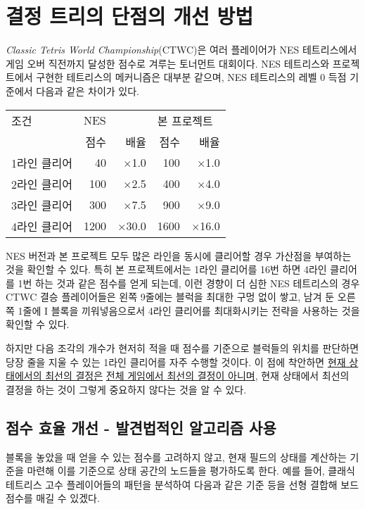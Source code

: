 \section{결정 트리의 단점의 개선 방법}
\textit{Classic Tetris World Championship}(CTWC)은 여러 플레이어가 NES 테트리스에서
게임 오버 직전까지 달성한 점수로 겨루는 토너먼트 대회이다. NES 테트리스와 프로젝트에서 구현한 테트리스의 메커니즘은 대부분 같으며, NES 테트리스의
레벨 0 득점 기준에서 다음과 같은 차이가 있다.

\begin{center}
    \begin{tabular}{l|rr|rr}
        조건 & \multicolumn{2}{l|}{NES} & \multicolumn{2}{l}{본 프로젝트} \\
         & 점수 & 배율 & 점수 & 배율 \\
        \hline
        1라인 클리어 & 40 & $\times$1.0 & 100 & $\times$1.0 \\
        2라인 클리어 & 100 & $\times$2.5 & 400 & $\times$4.0 \\
        3라인 클리어 & 300 & $\times$7.5 & 900 & $\times$9.0 \\
        4라인 클리어 & 1200 & $\times$30.0 & 1600 & $\times$16.0 \\
    \end{tabular}    
\end{center}

NES 버전과 본 프로젝트 모두 많은 라인을 동시에 클리어할 경우 가산점을 부여하는 것을 확인할 수 있다.
특히 본 프로젝트에서는 1라인 클리어를 16번 하면 4라인 클리어를 1번 하는 것과 같은 점수를 얻게 되는데, 이런 경향이 더 심한 NES 테트리스의 경우
CTWC 결승 플레이어들은 왼쪽 9줄에는 블럭을 최대한 구멍 없이 쌓고, 남겨 둔 오른쪽 1줄에 I 블록을 끼워넣음으로서
4라인 클리어를 최대화시키는 전략을 사용하는 것을 확인할 수 있다.\cite{CTWC}

하지만 다음 조각의 개수가 현저히 적을 때 점수를 기준으로 블럭들의 위치를 판단하면 당장 줄을 지울 수 있는 1라인 클리어를 자주 수행할 것이다.
이 점에 착안하면 \underline{현재 상태에서의 최선의 결정은}
\underline{전체 게임에서 최선의 결정이 아니며}, 현재 상태에서 최선의 결정을 하는 것이 그렇게 중요하지 않다는 것을 알 수 있다.

\subsection{점수 효율 개선 - 발견법적인 알고리즘 사용}

블록을 놓았을 때 얻을 수 있는 점수를 고려하지 않고, 현재 필드의 상태를 계산하는 기준을 마련해 이를 기준으로 상태 공간의 노드들을 평가하도록 한다.
예를 들어, 클래식 테트리스 고수 플레이어들의 패턴을 분석하여 다음과 같은 기준 등을 선형 결합해 보드 점수를 매길 수 있겠다.


